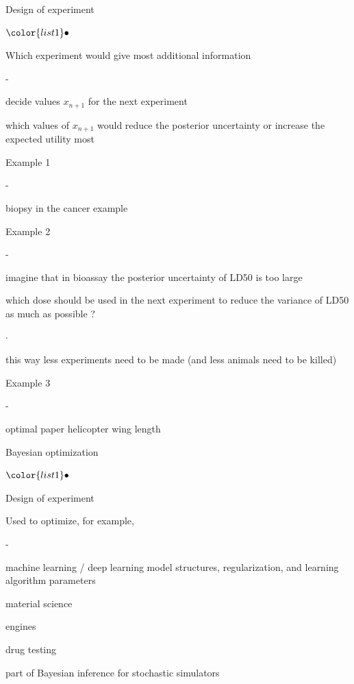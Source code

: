 \documentclass[t]{beamer}
\newenvironment{list1}{
   \begin{list}{$\color{list1}\bullet$}{\itemsep=6pt}}{
  \end{list}}
\newenvironment{list2}{
  \begin{list}{-}{\baselineskip=12pt\itemsep=2pt}}{
  \end{list}}
\newenvironment{list3}{
  \begin{list}{$\cdot$}{\baselineskip=15pt}}{
  \end{list}}
\begin{document}
\begin{frame}{Design of experiment}

  \begin{list1}
  \item Which experiment would give most additional information
    \begin{list2}
    \item decide values $x_{n+1}$ for the next experiment
    \item which values of $x_{n+1}$ would reduce the posterior
      uncertainty or increase the expected utility most
    \end{list2}
  \item<2-> Example 1
    \begin{list2}
      \item biopsy in the cancer example
    \end{list2}
  \item<3-> Example 2
    \begin{list2}
    \item imagine that in bioassay the posterior uncertainty of LD50 is too large
    \item which dose should be used in the next experiment to reduce
      the variance of LD50 as much as possible ?
      \begin{list3}
        \item this way less experiments need to be made (and less animals need to be killed)
      \end{list3}
    \end{list2}
  \item<4-> Example 3
    \begin{list2}
      \item optimal paper helicopter wing length
    \end{list2}
  \end{list1}
\end{frame}

\begin{frame}{Bayesian optimization}

  \begin{list1}
  \item Design of experiment
  \item Used to optimize, for example,
    \begin{list2}
    \item machine learning / deep learning model structures,
      regularization, and learning algorithm parameters
    \item material science
    \item engines
    \item drug testing
    \item part of Bayesian inference for stochastic simulators
    \end{list2}
  \end{list1}

\end{frame}
\end{document}
